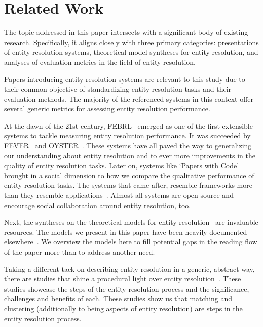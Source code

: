 \documentclass[journal]{IEEEtran}
\begin{document}
    \section{Related Work}\label{sec:related}
    
    The topic addressed in this paper intersects with a significant body of
    existing research.
    Specifically, it aligns closely with three primary categories: presentations
    of entity resolution systems, theoretical model syntheses for entity
    resolution, and analyses of evaluation metrics in the field of entity
    resolution.

    Papers introducing entity resolution systems are relevant to this study due
    to their common objective of standardizing entity resolution tasks and their
    evaluation methods.
    The majority of the referenced systems in this context offer several generic
    metrics for assessing entity resolution performance.

    At the dawn of the 21st century, FEBRL~\cite{febrl2002} emerged as one of the
    first extensible systems to tackle measuring entity resolution performance.
    It was succeeded by FEVER~\cite{fever2009} and OYSTER~\cite{oyster2012}.
    These systems have all paved the way to generalizing our understanding about
    entity resolution and to ever more improvements in the quality of entity
    resolution tasks.
    Later on, systems like `Papers with Code'~\cite{papwithcode2019} brought in
    a social dimension to how we compare the qualitative performance of entity
    resolution tasks.
    The systems that came after, resemble frameworks more than they resemble
    applications~\cite{magellan2020,jedai2017}.
    Almost all systems are open-source and encourage social collaboration around
    entity resolution, too.
    
    Next, the syntheses on the theoretical models for entity
    resolution~\cite{fs1969,Ben2009Swoosh,Tal11} are invaluable resources.
    The models we present in this paper have been heavily documented
    elsewhere~\cite{Tal11,tal2013}.    
    We overview the models here to fill potential gaps in the reading flow of
    the paper more than to address another need.
    
    Taking a different tack on describing entity resolution in a generic,
    abstract way, there are studies that shine a procedural light over entity
    resolution~\cite{Pap19,Chen09}.
    These studies showcase the steps of the entity resolution process and the
    significance, challenges and benefits of each.
    These studies show us that matching and clustering (additionally to being
    aspects of entity resolution) are steps in the entity resolution process.
\end{document}
